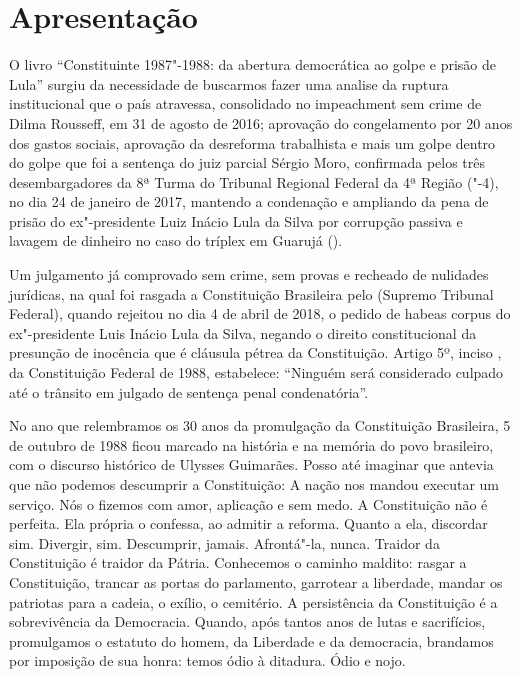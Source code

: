 \chapter{Apresentação}%

O livro “Constituinte 1987"-1988: da abertura democrática ao golpe e prisão de Lula” surgiu da necessidade de buscarmos fazer uma analise da ruptura institucional que o país atravessa, consolidado no impeachment sem crime de Dilma Rousseff, em 31 de agosto de 2016; aprovação do congelamento por 20 anos dos gastos sociais, aprovação da desreforma trabalhista e mais um golpe dentro do golpe que foi a sentença do juiz parcial Sérgio Moro, confirmada pelos três desembargadores da 8ª Turma do Tribunal Regional Federal da 4ª Região ("-4), no dia 24 de janeiro de 2017, mantendo a condenação e ampliando da pena de prisão do ex"-presidente Luiz Inácio Lula da Silva por corrupção passiva e lavagem de dinheiro no caso do tríplex em Guarujá ().

Um julgamento já comprovado sem crime, sem provas e recheado de nulidades jurídicas, na qual foi rasgada a Constituição Brasileira pelo  (Supremo Tribunal Federal), quando rejeitou no dia 4 de abril de 2018, o pedido de habeas corpus do ex"-presidente Luis Inácio Lula da Silva, negando o direito constitucional da presunção de inocência que é cláusula pétrea da Constituição. Artigo 5º, inciso , da Constituição Federal de 1988, estabelece: “Ninguém será considerado culpado até o trânsito em julgado de sentença penal condenatória”.

No ano que relembramos os 30 anos da promulgação da Constituição Brasileira, 5 de outubro de 1988 ficou marcado na história e na memória do povo brasileiro, com o discurso histórico de Ulysses Guimarães. Posso até imaginar que antevia que não podemos descumprir a Constituição: A nação nos mandou executar um serviço. Nós o fizemos com amor, aplicação e sem medo. A Constituição não é perfeita. Ela própria o confessa, ao admitir a reforma. Quanto a ela, discordar sim. Divergir, sim. Descumprir, jamais. Afrontá"-la, nunca. Traidor da Constituição é traidor da Pátria. Conhecemos o caminho maldito: rasgar a Constituição, trancar as portas do parlamento, garrotear a liberdade, mandar os patriotas para a cadeia, o exílio, o cemitério. A persistência da Constituição é a sobrevivência da Democracia. Quando, após tantos anos de lutas e sacrifícios, promulgamos o estatuto do homem, da Liberdade e da democracia, brandamos por imposição de sua honra: temos ódio à ditadura. Ódio e nojo.

